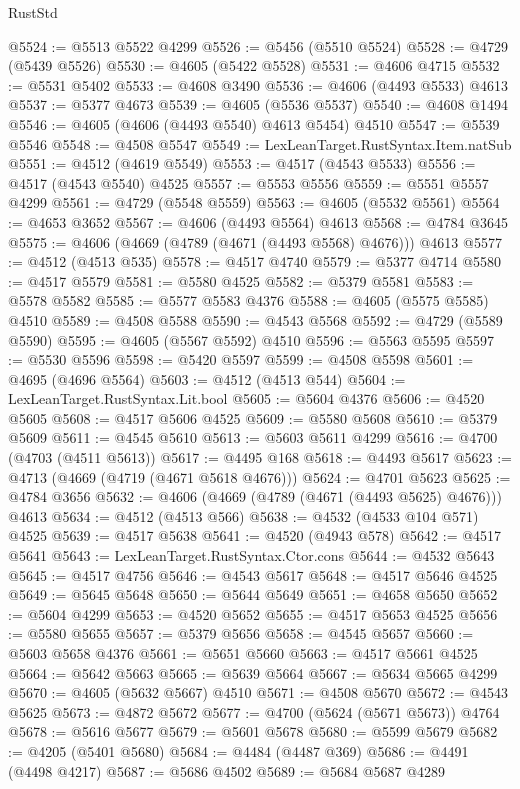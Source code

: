\begin{lexlean}{RustStd}
\begin{coremodule}
@5524 := @5513 @5522 @4299
@5526 := @5456 (@5510 @5524)
@5528 := @4729 (@5439 @5526)
@5530 := @4605 (@5422 @5528)
@5531 := @4606 @4715
@5532 := @5531 @5402
@5533 := @4608 @3490
@5536 := @4606 (@4493 @5533) @4613
@5537 := @5377 @4673
@5539 := @4605 (@5536 @5537)
@5540 := @4608 @1494
@5546 := @4605 (@4606 (@4493 @5540) @4613 @5454) @4510
@5547 := @5539 @5546
@5548 := @4508 @5547
@5549 := LexLeanTarget.RustSyntax.Item.natSub
@5551 := @4512 (@4619 @5549)
@5553 := @4517 (@4543 @5533)
@5556 := @4517 (@4543 @5540) @4525
@5557 := @5553 @5556
@5559 := @5551 @5557 @4299
@5561 := @4729 (@5548 @5559)
@5563 := @4605 (@5532 @5561)
@5564 := @4653 @3652
@5567 := @4606 (@4493 @5564) @4613
@5568 := @4784 @3645
@5575 := @4606 (@4669 (@4789 (@4671 (@4493 @5568) @4676))) @4613
@5577 := @4512 (@4513 @535)
@5578 := @4517 @4740
@5579 := @5377 @4714
@5580 := @4517 @5579
@5581 := @5580 @4525
@5582 := @5379 @5581
@5583 := @5578 @5582
@5585 := @5577 @5583 @4376
@5588 := @4605 (@5575 @5585) @4510
@5589 := @4508 @5588
@5590 := @4543 @5568
@5592 := @4729 (@5589 @5590)
@5595 := @4605 (@5567 @5592) @4510
@5596 := @5563 @5595
@5597 := @5530 @5596
@5598 := @5420 @5597
@5599 := @4508 @5598
@5601 := @4695 (@4696 @5564)
@5603 := @4512 (@4513 @544)
@5604 := LexLeanTarget.RustSyntax.Lit.bool
@5605 := @5604 @4376
@5606 := @4520 @5605
@5608 := @4517 @5606 @4525
@5609 := @5580 @5608
@5610 := @5379 @5609
@5611 := @4545 @5610
@5613 := @5603 @5611 @4299
@5616 := @4700 (@4703 (@4511 @5613))
@5617 := @4495 @168
@5618 := @4493 @5617
@5623 := @4713 (@4669 (@4719 (@4671 @5618 @4676)))
@5624 := @4701 @5623
@5625 := @4784 @3656
@5632 := @4606 (@4669 (@4789 (@4671 (@4493 @5625) @4676))) @4613
@5634 := @4512 (@4513 @566)
@5638 := @4532 (@4533 @104 @571) @4525
@5639 := @4517 @5638
@5641 := @4520 (@4943 @578)
@5642 := @4517 @5641
@5643 := LexLeanTarget.RustSyntax.Ctor.cons
@5644 := @4532 @5643
@5645 := @4517 @4756
@5646 := @4543 @5617
@5648 := @4517 @5646 @4525
@5649 := @5645 @5648
@5650 := @5644 @5649
@5651 := @4658 @5650
@5652 := @5604 @4299
@5653 := @4520 @5652
@5655 := @4517 @5653 @4525
@5656 := @5580 @5655
@5657 := @5379 @5656
@5658 := @4545 @5657
@5660 := @5603 @5658 @4376
@5661 := @5651 @5660
@5663 := @4517 @5661 @4525
@5664 := @5642 @5663
@5665 := @5639 @5664
@5667 := @5634 @5665 @4299
@5670 := @4605 (@5632 @5667) @4510
@5671 := @4508 @5670
@5672 := @4543 @5625
@5673 := @4872 @5672
@5677 := @4700 (@5624 (@5671 @5673)) @4764
@5678 := @5616 @5677
@5679 := @5601 @5678
@5680 := @5599 @5679
@5682 := @4205 (@5401 @5680)
@5684 := @4484 (@4487 @369)
@5686 := @4491 (@4498 @4217)
@5687 := @5686 @4502
@5689 := @5684 @5687 @4289

\end{coremodule}
\end{lexlean}
